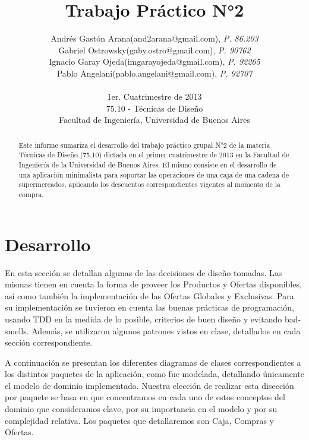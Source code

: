 \documentclass[a4paper,11pt]{article}
\title{\textbf{Trabajo Práctico N°2}}
\author{
  Andrés Gastón Arana(and2arana@gmail.com), \textit{P. 86.203}     \\
  Gabriel Ostrowsky(gaby.ostro@gmail.com), \textit{P. 90762}       \\
  Ignacio Garay Ojeda(imgarayojeda@gmail.com), \textit{P. 92265}   \\
  Pablo Angelani(pablo.angelani@gmail.com), \textit{P. 92707}      \\
  \\
  \normalsize{1er. Cuatrimestre de 2013}                           \\
  \normalsize{75.10 - Técnicas de Diseño}                          \\
  \normalsize{Facultad de Ingeniería, Universidad de Buenos Aires}
}
\date{}
\begin{document}
\thispagestyle{empty}
\maketitle

\begin{abstract}

  Este informe sumariza el desarrollo del trabajo práctico grupal N°2 de la
  materia Técnicas de Diseño (75.10) dictada en el primer cuatrimestre de 2013
  en la Facultad de Ingeniería de la Universidad de Buenos Aires. El mismo
  consiste en el desarrollo de una aplicación minimalista para soportar las
  operaciones de una caja de una cadena de supermercados, aplicando los
  descuentos correspondientes vigentes al momento de la compra.

\end{abstract}

\clearpage

\tableofcontents
\clearpage


\part{Desarrollo}

En esta sección se detallan algunas de las decisiones de diseño tomadas. Las
mismas tienen en cuenta la forma de proveer los Productos y Ofertas
disponibles, así como también la implementación de las Ofertas Globales y
Exclusivas.  Para su implementación se tuvieron en cuenta las buenas prácticas
de programación, usando TDD en la medida de lo posible, criterios de buen
diseño y evitando bad-smells.  Además, se utilizaron algunos patrones vistos en
clase, detallados en cada sección correspondiente.

A continuación se presentan los diferentes diagramas de clases correspondientes
a los distintos paquetes de la aplicación, como fue modelada, detallando
únicamente el modelo de dominio implementado. Nuestra elección de realizar esta
disección por paquete se basa en que concentramos en cada uno de estos
conceptos del dominio que consideramos clave, por su importancia en el modelo y
por su complejidad relativa. Los paquetes que detallaremos son Caja, Compras y
Ofertas.
\end{document}
